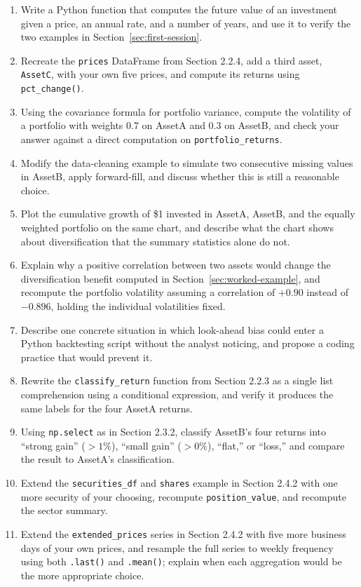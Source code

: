\documentclass[../ai_in_finance]{subfiles}
\begin{document}
\begin{enumerate}
    \item Write a Python function that computes the future value of an investment given a price, an annual rate, and a number of years, and use it to verify the two examples in Section~\ref{sec:first-session}.
    \item Recreate the \texttt{prices} DataFrame from Section 2.2.4, add a third asset, \texttt{AssetC}, with your own five prices, and compute its returns using \texttt{pct\_change()}.
    \item Using the covariance formula for portfolio variance, compute the volatility of a portfolio with weights 0.7 on AssetA and 0.3 on AssetB, and check your answer against a direct computation on \texttt{portfolio\_returns}.
    \item Modify the data-cleaning example to simulate two consecutive missing values in AssetB, apply forward-fill, and discuss whether this is still a reasonable choice.
    \item Plot the cumulative growth of \$1 invested in AssetA, AssetB, and the equally weighted portfolio on the same chart, and describe what the chart shows about diversification that the summary statistics alone do not.
    \item Explain why a positive correlation between two assets would change the diversification benefit computed in Section~\ref{sec:worked-example}, and recompute the portfolio volatility assuming a correlation of $+0.90$ instead of $-0.896$, holding the individual volatilities fixed.
    \item Describe one concrete situation in which look-ahead bias could enter a Python backtesting script without the analyst noticing, and propose a coding practice that would prevent it.
    \item Rewrite the \texttt{classify\_return} function from Section 2.2.3 as a single list comprehension using a conditional expression, and verify it produces the same labels for the four AssetA returns.
    \item Using \texttt{np.select} as in Section 2.3.2, classify AssetB's four returns into ``strong gain'' ($>1\%$), ``small gain'' ($>0\%$), ``flat,'' or ``loss,'' and compare the result to AssetA's classification.
    \item Extend the \texttt{securities\_df} and \texttt{shares} example in Section 2.4.2 with one more security of your choosing, recompute \texttt{position\_value}, and recompute the sector summary.
    \item Extend the \texttt{extended\_prices} series in Section 2.4.2 with five more business days of your own prices, and resample the full series to weekly frequency using both \texttt{.last()} and \texttt{.mean()}; explain when each aggregation would be the more appropriate choice.

\end{enumerate}
\end{document}
